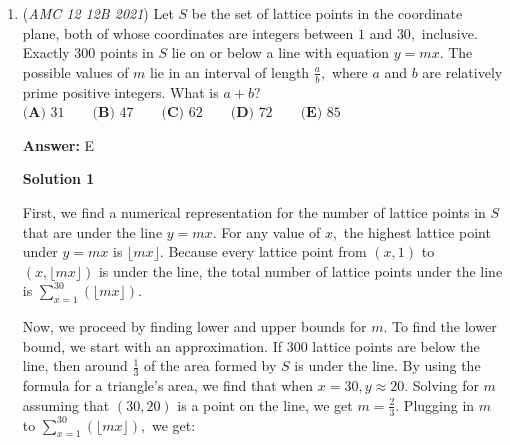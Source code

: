\begin{enumerate}
 $\frac{1}{2} \cdot m \cdot (y + 3) = \frac{15}{4} \implies m = \frac{15}{2(y + 3)}$

 Remember that we established the fact that triangle $APT$ is similar to triangle $STD$ and so:

 $\frac{4}{3} = \frac{\frac{15}{2(y + 3)}}{h} \implies h(y + 3) = 10$

 Also by the Pythagorean Theorem on triangle $STD$
$h^{2} + 16 = (y + 3)^{2} \implies h^{2} + 16 = \frac{100}{h^{2}} \implies h^{4} + 16h^{2} - 100 = 0 \implies h^{2} = \frac{-16 \pm \sqrt{16 \cdot 16 - 4(-100)}}{2} = \frac{-16 \pm \sqrt{16 \cdot 16 + 16 \cdot 25}}{2} = \frac{-16 \pm 4\sqrt{41}}{2} = -8 \pm 2\sqrt{41}$.

 Since $h^{2}$ is positive, $h^{2} = -8 + 2\sqrt{41}$. We need to find $BD^{2} = (y + 3 + 3 + y)^{2} = 4(y + 3)^{2}$ so remember $(y + 3)^{2} = \frac{100}{h^{2}} = \frac{100}{-8 + 2\sqrt{41}} = 8 + 2\sqrt{41}$. But $BD^{2}$ is $4$ times this so the answer is $4(8 + 2\sqrt{41}) = 32 + 8\sqrt{41}$. Hence $32 + 8 + 41 = 81 \implies \boxed{\textbf{(A)}}$



	\item (\textit{AMC 12 12B 2021}) Let $S$ be the set of lattice points in the coordinate plane, both of whose coordinates are integers between $1$ and $30,$ inclusive. Exactly $300$ points in $S$ lie on or below a line with equation $y=mx.$ The possible values of $m$ lie in an interval of length $\frac ab,$ where $a$ and $b$ are relatively prime positive integers. What is $a+b?$
$\textbf{(A) }31 \qquad \textbf{(B) }47 \qquad \textbf{(C) }62\qquad \textbf{(D) }72 \qquad \textbf{(E) }85$

 \textbf{Answer: }E



\textbf{Solution 1}

First, we find a numerical representation for the number of lattice points in $S$ that are under the line $y=mx.$ For any value of $x,$ the highest lattice point under $y=mx$ is $\lfloor mx \rfloor.$ Because every lattice point from $(x, 1)$ to $(x, \lfloor mx \rfloor)$ is under the line, the total number of lattice points under the line is $\sum_{x=1}^{30}(\lfloor mx \rfloor).$

 
Now, we proceed by finding lower and upper bounds for $m.$ To find the lower bound, we start with an approximation. If $300$ lattice points are below the line, then around $\frac{1}{3}$ of the area formed by $S$ is under the line. By using the formula for a triangle's area, we find that when $x=30, y \approx 20.$ Solving for $m$ assuming that $(30, 20)$ is a point on the line, we get $m = \frac{2}{3}.$ Plugging in $m$ to $\sum_{x=1}^{30}(\lfloor mx \rfloor),$ we get:


\end{enumerate}
